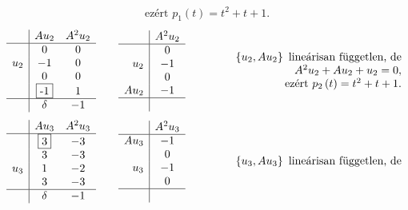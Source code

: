 \documentclass[9pt, a4paper, showtrims]{memoir}
\makeatletter
\renewenvironment{proof}[1][\proofname]
    {\par\pushQED{\qed}%
    \normalfont \topsep6\p@\@plus6\p@\relax
    \trivlist
    \item[\hskip\labelsep
        \itshape
    #1\@addpunct{:}]\ignorespaces}
    {\popQED\endtrivlist\@endpefalse}
\theoremstyle{plain}
\theoremstyle{remark}
\theoremstyle{definition}
\makeatother
\begin{document}
\begin{proof}[Megoldás]
\[\begin{array}{r}
			\mbox{ezért } p_1\left( t \right)=t^2+t+1.
		\end{array}
	\]
	\[
		\begin{array}{r|cc}
			    & Au_2          & A^2u_2 \\
			\hline
			    & 0             & 0      \\
			u_2 & -1            & 0      \\
			    & 0             & 0      \\
			    & \framebox{-1} & 1      \\
			\hline
			    & \delta        & -1
		\end{array}
		\qquad
		\begin{array}{r|c}
			     & A^2u_2 \\
			\hline
			     & 0      \\
			u_2  & -1     \\
			     & 0      \\
			Au_2 & -1     \\
			\hline
			     &
		\end{array}
		\qquad\qquad
		\begin{array}{r}
			\left\{ u_2,Au_2 \right\}\mbox{ lineárisan független, de} \\
			A^2u_2+Au_2+u_2=0,                                        \\
			\mbox{ezért } p_2\left( t \right)=t^2+t+1.
		\end{array}
	\]
	\[
		\begin{array}{r|cc}
			    & Au_3         & A^2u_3 \\
			\hline
			    & \framebox{3} & -3     \\
			    & 3            & -3     \\
			u_3 & 1            & -2     \\
			    & 3            & -3     \\
			\hline
			    & \delta       & -1
		\end{array}
		\qquad
		\begin{array}{r|c}
			     & A^2u_3 \\
			\hline
			Au_3 & -1     \\
			     & 0      \\
			u_3  & -1     \\
			     & 0      \\
			\hline
			     &
		\end{array}
		\qquad\qquad
		\begin{array}{r}
			\left\{ u_3,Au_3 \right\}\mbox{ lineárisan független, de} \\

\end{array}\]
\end{proof}
\end{document}
